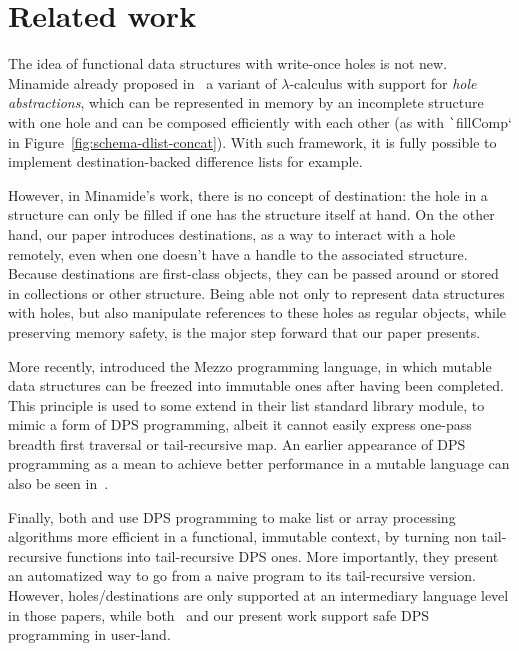 \documentclass[english]{jflart}
\begin{document}
\section{Related work}

The idea of functional data structures with write-once holes is not new. Minamide already proposed in~\cite{minamide_functional_1998} a variant of $\lambda$-calculus with support for \emph{hole abstractions}, which can be represented in memory by an incomplete structure with one hole and can be composed efficiently with each other (as with \texttt`fillComp` in Figure~\ref{fig:schema-dlist-concat}). With such framework, it is fully possible to implement destination-backed difference lists for example.

However, in Minamide's work, there is no concept of destination: the hole in a structure can only be filled if one has the structure itself at hand. On the other hand, our paper introduces destinations, as a way to interact with a hole remotely, even when one doesn't have a handle to the associated structure. Because destinations are first-class objects, they can be passed around or stored in collections or other structure. Being able not only to represent data structures with holes, but also manipulate references to these holes as regular objects, while preserving memory safety, is the major step forward that our paper presents.

More recently, \cite{protzenko_mezzo_2013} introduced the Mezzo programming language, in which mutable data structures can be freezed into immutable ones after having been completed. This principle is used to some extend in their list standard library module, to mimic a form of DPS programming, albeit it cannot easily express one-pass breadth first traversal or tail-recursive map. An earlier appearance of DPS programming as a mean to achieve better performance in a mutable language can also be seen in~\cite{larus_restructuring_1989}.

Finally, both \cite{shaikhha_destination-passing_2017} and \cite{bour_tmc_2021} use DPS programming to make list or array processing algorithms more efficient in a functional, immutable context, by turning non tail-recursive functions into tail-recursive DPS ones. More importantly, they present an automatized way to go from a naive program to its tail-recursive version. However, holes/destinations are only supported at an intermediary language level in those papers, while both~\cite{minamide_functional_1998} and our present work support safe DPS programming in user-land.
\end{document}
